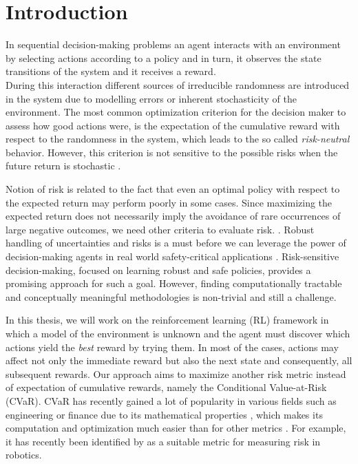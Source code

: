 \chapter{Introduction}
\label{sec:introduction}


In sequential decision-making problems an agent interacts with an environment by
selecting actions according to a policy 
and in turn, it observes the state transitions of the system and it receives a reward.\\
During this interaction different sources of irreducible 
randomness are introduced in the system due to modelling errors or inherent stochasticity of the environment.
The most common optimization criterion for the decision maker to assess how good actions were, 
is the expectation of the cumulative reward
with respect to the randomness in the system, which leads to the so called \textit{risk-neutral} behavior.
However, this criterion
is not sensitive to the possible risks when the future return
is stochastic \citep{tang2020}. 

Notion of risk is related to the fact that even an optimal policy with respect to the 
expected return may perform poorly in some cases.
Since maximizing the expected return does not necessarily imply the avoidance
of rare occurrences of large negative outcomes,
we need other criteria to evaluate risk. \citep{Garcia2015}. Robust handling of uncertainties and 
risks is a must before we can leverage the power 
of decision-making agents in real world safety-critical applications \citep{schwartz2017}.
Risk-sensitive decision-making, focused on learning robust and safe policies, provides a promising
approach for such a goal.
However, finding computationally tractable and conceptually meaningful methodologies is non-trivial and still a challenge.

In this thesis, we will work on the reinforcement learning (RL)
framework in which a model of the environment is unknown and the agent
must discover which actions yield the \textit{best} reward by trying them. 
In most of the cases,
actions may affect not only the immediate reward but also the next state and consequently,
all subsequent rewards.
Our approach aims to maximize
another risk metric instead of expectation of cumulative rewards, namely the Conditional Value-at-Risk (CVaR).
CVaR has recently gained a lot of popularity  in various fields such as engineering or finance
due to its mathematical properties \citep{Artzner1999},
which makes its computation and optimization much easier than for other metrics  \citep{Rockafellar2000}.
For example, 
it has recently been identified by \citet{Majumdar2020} as a suitable metric
for measuring risk in robotics.


